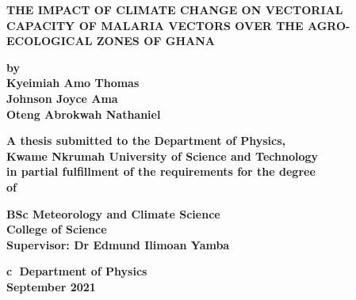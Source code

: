 \label{titlepage}

\begin{titlepage}
	\begin{center}
		
		\Large \textbf{THE IMPACT OF CLIMATE CHANGE ON VECTORIAL CAPACITY OF  MALARIA VECTORS OVER THE AGRO-ECOLOGICAL ZONES OF GHANA}\\ \vspace{10mm}
		
		\normalsize \textbf{by}\\ 
		
		\textbf{ Kyeimiah Amo Thomas \\Johnson Joyce Ama \\ Oteng Abrokwah Nathaniel}\\ 
		\vspace{10mm}
		
		\textbf{A thesis submitted to the Department of Physics,\\
			Kwame Nkrumah University of Science and Technology \\
			in partial fulfillment of the requirements for the degree\\
			of} \\ 
		\vspace{20mm} 
		
		\textbf{BSc Meteorology and Climate Science}\\  %
		
		\textbf{College of Science}\\ \vspace{20mm}
		\textbf{Supervisor: Dr Edmund Ilimoan Yamba} \\ 
		\vspace{20mm}
		
		\textbf{\textcircled{c} Department of Physics} \\ 
		\textbf{September 2021}
	\end{center}
\end{titlepage}
